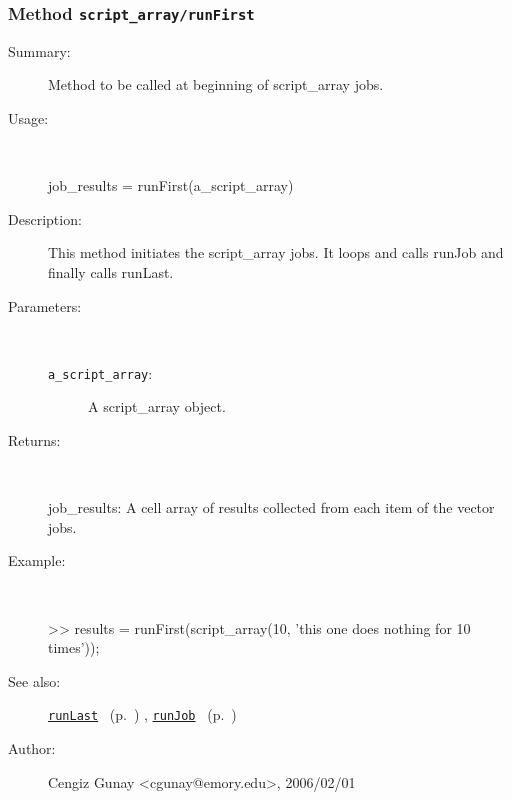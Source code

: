 \subsubsection[Method \texttt{runFirst}]{Method \texttt{script\_array/runFirst}}%
%
\label{ref_script_array__runFirst}%
\hypertarget{ref_script_array__runFirst}{}%
\begin{description}
\item[Summary:]Method to be called at beginning of script\_array jobs.
%
\item[Usage:]~%
\begin{lyxcode}%
job\_results = runFirst(a\_script\_array)
%
\end{lyxcode}%
%
\item[Description:]%
This method initiates the script\_array jobs. It loops and calls runJob and 
 finally calls runLast.
\item[Parameters:]~
\begin{description}%
\item[\texttt{a\_script\_array}:]
 A script\_array object.
\end{description}%
%
\item[Returns:
]~

	job\_results: A cell array of results collected from each item of the vector jobs.
%
\item[Example:]~
\begin{lyxcode} >> results = runFirst(script\_array(10, 'this one does nothing for 10 times'));
\\%
\end{lyxcode}
%
\item[See also:]%
\hyperlink{ref_runLast}{\texttt{runLast}}%
\ (p.~\pageref{ref_runLast})%
%
, \hyperlink{ref_runJob}{\texttt{runJob}}%
\ (p.~\pageref{ref_runJob})%
%
%
\item[Author:]%
Cengiz Gunay <cgunay@emory.edu>, 2006/02/01
%
\end{description}
\methodline%
